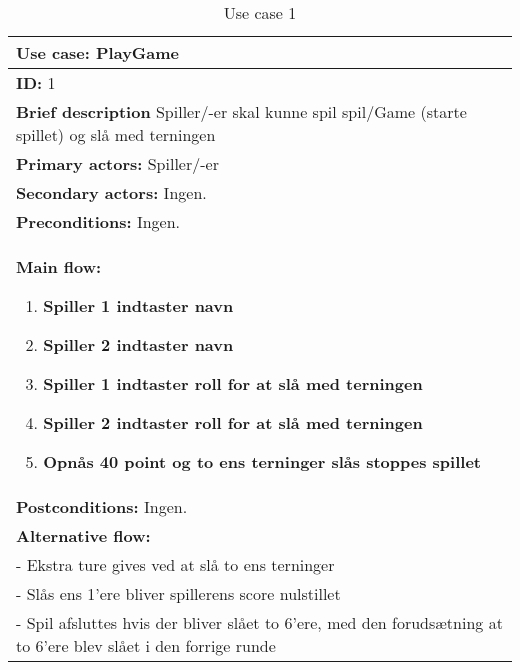 \begin{table}[H]
    \begin{center}
        \begin{tabular}{ | p{15cm} |}
            \hline
            \textbf{Use case:} PlayGame \\ \hline
            \textbf{ID:} 1 \\ \hline
            \textbf{Brief description} Spiller/-er skal kunne spil spil/Game (starte spillet) og slå med terningen     \\ \hline
            \textbf{Primary actors:} Spiller/-er \\ \hline
            \textbf{Secondary actors:} Ingen. \\ \hline
            \textbf{Preconditions:} Ingen.     \\ \hline
            \textbf{Main flow:}
            \begin{enumerate}
                \item \textbf{Spiller 1 indtaster navn}
                \item \textbf{Spiller 2 indtaster navn}
                \item \textbf{Spiller 1 indtaster roll for at slå med terningen}
                \item \textbf{Spiller 2 indtaster roll for at slå med terningen}
                \item \textbf{Opnås 40 point og to ens terninger slås stoppes spillet}    
            \end{enumerate} \\ \hline
            \textbf{Postconditions:} Ingen.\\ \hline
            \textbf{Alternative flow:}
            \\- Ekstra ture gives ved at slå to ens terninger
            \\- Slås ens 1’ere bliver spillerens score nulstillet
            \\- Spil afsluttes hvis der bliver slået to 6’ere, med den forudsætning at to 6’ere blev slået i den forrige runde  \\ \hline
            \hline
        \end{tabular}
        \caption{Use case 1}
        \label{usecase:1}
    \end{center}
\end{table}
